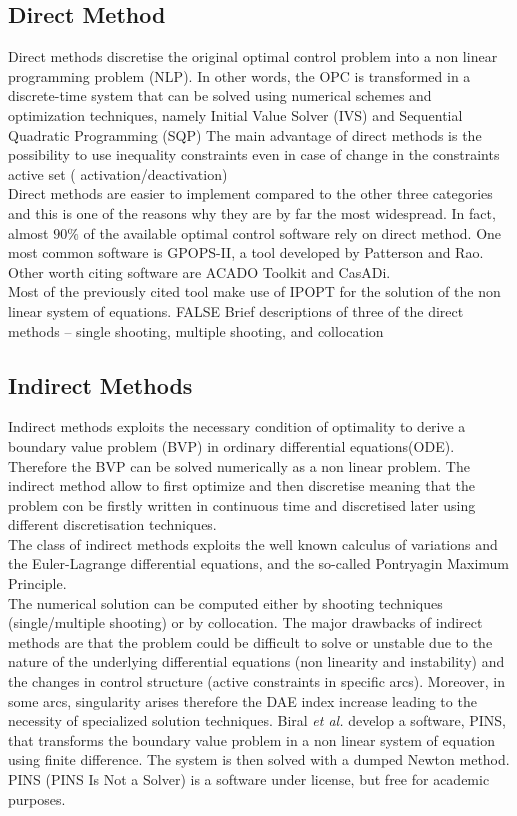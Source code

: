 \subsection{Direct Method}
%
Direct methods discretise the original optimal control problem into a  non linear programming problem (NLP). In other words, the OPC is transformed in a discrete-time system that can be solved using numerical schemes and optimization techniques, namely Initial Value Solver (IVS) and Sequential Quadratic Programming (SQP) \cite{bertolazzi2005symbolic}
The main advantage of direct methods is the possibility to use inequality constraints even in case of change in the constraints active set ( activation/deactivation)\cite{biral2016notes}\\
Direct methods are easier to implement compared to the other three categories and this is one of the reasons why they are by far the most widespread. In fact, almost $90\%$ of the available optimal control software rely on direct method. \cite{rao2009survey,rodrigues2014optimal}
One most common software is GPOPS-II\cite{patterson2014gpops}, a tool developed by Patterson and Rao. Other worth citing software are ACADO Toolkit\cite{Houska2011a} and CasADi\cite{Andersson2019}.\\
Most of the previously cited tool make use of IPOPT for the solution of the non linear system of equations.\cite{wachter2006implementation}
%
\if FALSE
Brief descriptions
of three of the direct methods – single shooting, multiple shooting, and collocation
\fi
%
\subsection{Indirect Methods}
%
Indirect methods exploits the necessary condition of optimality to derive a boundary value problem (BVP) in ordinary differential equations(ODE). Therefore the BVP can be solved numerically as a non linear problem. The indirect method allow to first optimize and then discretise meaning that the problem con be firstly written in continuous time and discretised later using different discretisation techniques.\\
The class of indirect methods exploits the well known calculus of variations and the Euler-Lagrange differential equations, and the so-called Pontryagin Maximum Principle.\cite{bertolazzi2006symbolic} \\
The numerical solution can be computed either by shooting techniques (single/multiple shooting) or by collocation.
The major drawbacks of indirect methods are that the problem could be difficult to solve or unstable due to the nature of the underlying differential equations (non linearity and instability) and the changes in control structure (active constraints in specific arcs). Moreover, in some arcs, singularity arises therefore the DAE index increase leading to the necessity of specialized solution techniques. \cite{biral2016notes}
Biral \textit{et al.}\cite{biral2016notes} develop a software, PINS, that transforms the boundary value problem in a non linear system of equation using finite difference. The system is then solved with a dumped Newton method. PINS (PINS Is Not a Solver) is a software under license, but free for academic purposes. 
%
